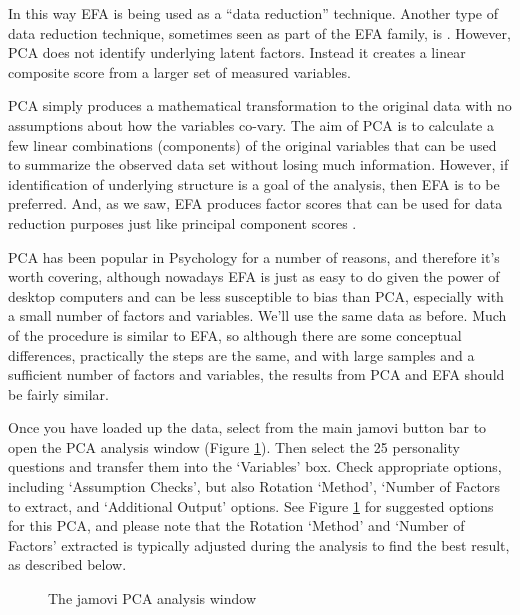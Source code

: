 In this way EFA is being used as a “data reduction” technique. Another type of data reduction technique, sometimes seen as part of the EFA family, is . However, PCA does not identify underlying latent factors. Instead it creates a linear composite score from a larger set of measured variables. 

PCA simply produces a mathematical transformation to the original data with no assumptions about how the variables co-vary. The aim of PCA is to calculate a few linear combinations (components) of the original variables that can be used to summarize the observed data set without losing much information. However, if identification of underlying structure is a goal of the analysis, then EFA is to be preferred. And, as we saw, EFA produces factor scores that can be used for data reduction purposes just like principal component scores \parencite{Fabrigar1999}.

PCA has been popular in Psychology for a number of reasons, and therefore it's worth covering, although nowadays EFA is just as easy to do given the power of desktop computers and can be less susceptible to bias than PCA, especially with a small number of factors and variables. We'll use the same  data as before. Much of the procedure is similar to EFA, so although there are some conceptual differences, practically the steps are the same, and with large samples and a sufficient number of factors and variables, the results from PCA and EFA should be fairly similar. 


Once you have loaded up the  data, select  from the main jamovi button bar to open the PCA analysis window (Figure \ref{fig:pca1}). Then select the 25 personality questions and transfer them into the ‘Variables’ box. Check appropriate options, including ‘Assumption Checks’, but also Rotation ‘Method’, ‘Number of Factors to extract, and ‘Additional Output’ options. See Figure \ref{fig:pca1} for suggested options for this  PCA, and please note that the Rotation ‘Method’ and ‘Number of Factors’ extracted is typically adjusted during the analysis to find the best result, as described below.

\begin{figure}[!htb]
\begin{center}
\caption{The jamovi PCA analysis window}
\label{fig:pca1}
\HR
\end{center}
\end{figure}

